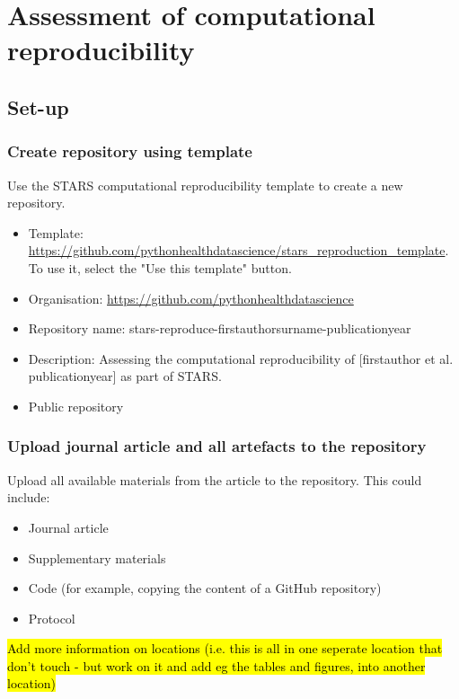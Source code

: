 \section{Assessment of computational reproducibility}

\subsection{Set-up}

\subsubsection{Create repository using template}
\timeno

Use the STARS computational reproducibility template to create a new repository.

\begin{itemize}
    \item Template: \url{https://github.com/pythonhealthdatascience/stars_reproduction_template}. To use it, select the "Use this template" button.
    \item Organisation: \url{https://github.com/pythonhealthdatascience}
    \item Repository name: stars-reproduce-firstauthorsurname-publicationyear
    \item Description: Assessing the computational reproducibility of [firstauthor et al. publicationyear] as part of STARS.
    \item Public repository
\end{itemize}

\subsubsection{Upload journal article and all artefacts to the repository}
\timeno

Upload all available materials from the article to the repository. This could include:
\begin{itemize}
    \item Journal article
    \item Supplementary materials
    \item Code (for example, copying the content of a GitHub repository)
    \item Protocol
\end{itemize}

\hl{Add more information on locations (i.e. this is all in one seperate location that don't touch - but work on it and add eg the tables and figures, into another location)}


